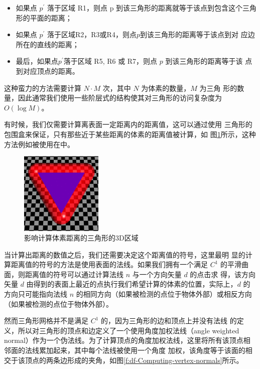 \begin{itemize}
	\item 如果点 $p^{'}$ 落于区域 R1，则点 p 到该三角形的距离就等于该点到包含这个三角形的平面的距离；
	\item 如果点 $p^{'}$ 落于区域R2，R3或R4，则点$p$到该三角形的距离等于该点到对 应边所在的直线的距离；
	\item 最后，如果点$p^{'}$落于区域 R5, R6 或 R7，则点 $p$ 到该三角形的距离等于该 点到对应顶点的距离。
\end{itemize}

这种蛮力的方法需要计算 $N \cdot M$ 次，其中 $N$ 为体素的数量，$M$ 为三角 形的数量，因此通常我们使用一些阶层式的结构使其对三角形的访问复杂度为 $O(\log M )$。

有时候，我们仅需要计算离表面一定距离内的距离值，这可以通过使用 三角形的包围盒来保证，只有那些近于某些距离的体素的距离值被计算，如 图\ref{f:df-close-triangle}所示，这种方法例如被使用在\cite{a:Incremental-Triangle-Voxelization}中。

\begin{figure}
	\sidecaption
	\includegraphics[width=0.35\textwidth]{figures/df/close-triangle}
	\caption{影响计算体素距离的三角形的3D区域}
	\label{f:df-close-triangle}
\end{figure}

当计算出距离的数值之后，我们还需要决定这个距离值的符号，这里最明 显的计算距离值的符号的方法是使用表面的法线。如果我们拥有一个满足 $C^{1}$ 的平滑曲面，则距离值的符号可以通过计算法线 $n$ 与一个方向矢量 $d$ 的点击求 得，该方向矢量 $d$ 由得到的表面上最近的点执行我们希望计算的体素的位置，实际上，$d$ 的方向只可能指向法线 $n$ 的相同方向（如果被检测的点位于物体外部）或相反方向（如果被检测的点位于物体外部）。

然而三角形网格并不是满足 $C^{1}$ 的，因为三角形的边和顶点上并没有法线 的定义，所以\cite{a:3d-distance-fields-a-survey}对三角形的顶点和边定义了一个使用角度加权法线（angle weighted normal）作为一个伪法线。为了计算顶点的角度加权法线，这里将所有该顶点相邻面的法线累加起来，其中每个法线被使用一个角度 加权，该角度等于该面的相交于该顶点的两条边形成的夹角，如图\ref{f:df-Computing-vertex-normals}所示。

